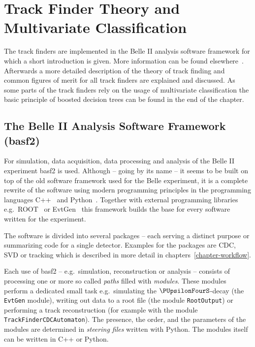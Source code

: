 \chapter{Track Finder Theory and Multivariate Classification} \label{chapter-theory}

The track finders are implemented in the Belle II analysis software framework for which a short introduction is given. More information can be found elsewhere~\cite{moll_basf2}. Afterwards a more detailed description of the theory of track finding and common figures of merit for all track finders are explained and discussed. As some parts of the track finders rely on the usage of multivariate classification the basic principle of boosted decision trees can be found in the end of the chapter.

\section{The Belle II Analysis Software Framework (basf2)}

For simulation, data acquisition, data processing and analysis of the Belle II experiment basf2 is used. Although -- going by its name -- it seems to be built on top of the old software framework used for the Belle experiment, it is a complete rewrite of the software using modern programming principles in the programming languages C++~\cite{cpp} and Python~\cite{python}. Together with external programming libraries e.g.\ ROOT~\cite{root} or EvtGen~\cite{evtgen} this framework builds the base for every software written for the experiment.

The software is divided into several packages -- each serving a distinct purpose or summarizing code for a single detector. Examples for the packages are CDC, SVD or tracking which is described in more detail in chapters~\ref{chapter-workflow}.

Each use of basf2 -- e.g.\ simulation, reconstruction or analysis -- consists of processing one or more so called \emph{paths} filled with \emph{modules}. These modules perform a dedicated small task e.g.\ simulating the $\PUpsilonFourS$-decay (the \texttt{EvtGen} module), writing out data to a root file (the module \texttt{RootOutput}) or performing a track reconstruction (for example with the module \texttt{TrackFinderCDCAutomaton}). The presence, the order, and the parameters of the modules are determined in \emph{steering files} written with Python. The modules itself can be written in C++ or Python. 

